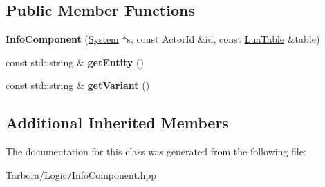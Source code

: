 \subsection*{Public Member Functions}
\begin{DoxyCompactItemize}
\item 
\mbox{\label{classTarbora_1_1InfoComponent_a02d7b59bac3005f9d64bf23ca9b355e6}} 
{\bfseries Info\+Component} (\hyperlink{classTarbora_1_1System}{System} $\ast$s, const Actor\+Id \&id, const \hyperlink{classTarbora_1_1LuaTable}{Lua\+Table} \&table)
\item 
\mbox{\label{classTarbora_1_1InfoComponent_ac97874d9cab2a24cfc92a7d847614bd0}} 
const std\+::string \& {\bfseries get\+Entity} ()
\item 
\mbox{\label{classTarbora_1_1InfoComponent_a1aaab6d0d64bd6b5712a6ab887e4dc37}} 
const std\+::string \& {\bfseries get\+Variant} ()
\end{DoxyCompactItemize}
\subsection*{Additional Inherited Members}


The documentation for this class was generated from the following file\+:\begin{DoxyCompactItemize}
\item 
Tarbora/\+Logic/Info\+Component.\+hpp\end{DoxyCompactItemize}

